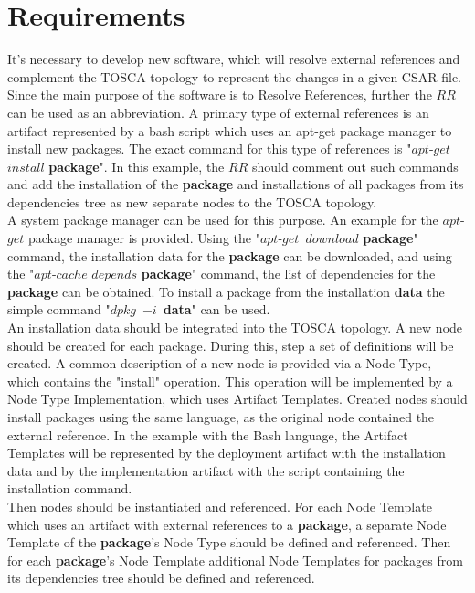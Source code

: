 
\chapter{Requirements}\label{chap:req}
It's necessary to develop new software, which will resolve external references and complement the TOSCA topology to represent the changes in a given CSAR file.
Since the main purpose of the software is to Resolve References, further the $RR$ can be used as an abbreviation. 
A primary type of external references is an artifact represented by a bash script which uses an apt-get package manager to install new packages.
The exact command for this type of references is "$apt$-$get$~$install$ \textbf{package}".
In this example, the $RR$ should comment out such commands and add the installation of the \textbf{package} and installations of all packages from its dependencies tree as new separate nodes to the TOSCA topology. \\
A system package manager can be used for this purpose. 
An example for the $apt$-$get$ package manager is provided. 
Using the "$apt$-$get$~$download$ \textbf{package}" command, the installation data for the \textbf{package} can be downloaded, and using the "$apt$-$cache$ $depends$ \textbf{package}" command, the list of dependencies for the \textbf{package} can be obtained. 
To install a package from the installation \textbf{data} the simple command "$dpkg$~$-i$~\textbf{data}" can be used.\\
An installation data should be integrated into the TOSCA topology. 
A new node should be created for each package. 
During this, step a set of definitions will be created.
A common description of a new node is provided via a Node Type, which contains the "install" operation. 
This operation will be implemented by a Node Type Implementation, which uses Artifact Templates.
Created nodes should install packages using the same language, as the original node contained the external reference.
In the example with the Bash language, the Artifact Templates will be represented by the deployment artifact with the installation data and by the implementation artifact with the script containing the installation command. \\
Then nodes should be instantiated and referenced.
For each Node Template which uses an artifact with external references to a \textbf{package}, a separate Node Template of the \textbf{package}'s Node Type should be defined and referenced.
Then for each \textbf{package}'s Node Template additional Node Templates for packages from its dependencies tree should be defined and referenced.
